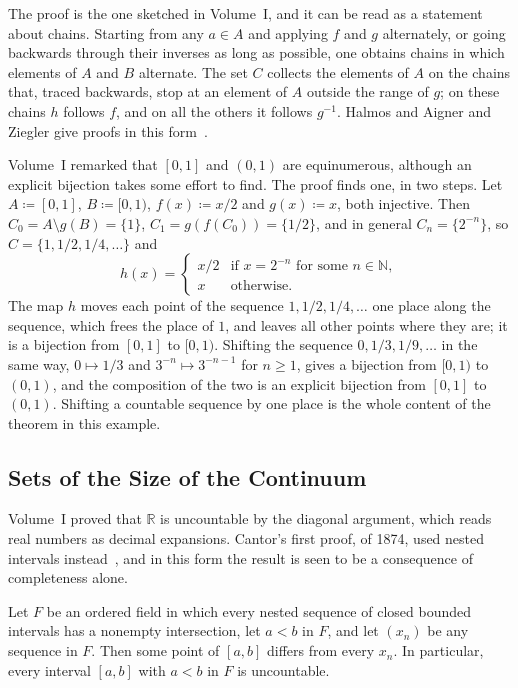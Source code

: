 The proof is the one sketched in Volume~I, and it can be read as a statement about chains. Starting from any $a\in A$ and applying $f$ and $g$ alternately, or going backwards through their inverses as long as possible, one obtains chains in which elements of $A$ and $B$ alternate. The set $C$ collects the elements of $A$ on the chains that, traced backwards, stop at an element of $A$ outside the range of $g$; on these chains $h$ follows $f$, and on all the others it follows $g^{-1}$. Halmos and Aigner and Ziegler give proofs in this form~\cite{halmos1960naive,aigner2018proofs}.

Volume~I remarked that $[0,1]$ and $(0,1)$ are equinumerous, although an explicit bijection takes some effort to find. The proof finds one, in two steps. Let $A\coloneqq[0,1]$, $B\coloneqq[0,1)$, $f(x)\coloneqq x/2$ and $g(x)\coloneqq x$, both injective. Then $C_0=A\setminus g(B)=\{1\}$, $C_1=g(f(C_0))=\{1/2\}$, and in general $C_n=\{2^{-n}\}$, so $C=\{1,1/2,1/4,\ldots\}$ and
\[
h(x)=\begin{cases}x/2&\text{if }x=2^{-n}\text{ for some }n\in\mathbb N,\\ x&\text{otherwise}.\end{cases}
\]
The map $h$ moves each point of the sequence $1,1/2,1/4,\ldots$ one place along the sequence, which frees the place of $1$, and leaves all other points where they are; it is a bijection from $[0,1]$ to $[0,1)$. Shifting the sequence $0,1/3,1/9,\ldots$ in the same way, $0\mapsto1/3$ and $3^{-n}\mapsto3^{-n-1}$ for $n\ge1$, gives a bijection from $[0,1)$ to $(0,1)$, and the composition of the two is an explicit bijection from $[0,1]$ to $(0,1)$. Shifting a countable sequence by one place is the whole content of the theorem in this example.

\subsection{Sets of the Size of the Continuum}

Volume~I proved that $\mathbb R$ is uncountable by the diagonal argument, which reads real numbers as decimal expansions. Cantor's first proof, of 1874, used nested intervals instead~\cite{cantor1874}, and in this form the result is seen to be a consequence of completeness alone.

\begin{proposition}
\label{prop:cantor-nested}
Let $F$ be an ordered field in which every nested sequence of closed bounded intervals has a nonempty intersection, let $a<b$ in $F$, and let $(x_n)$ be any sequence in $F$. Then some point of $[a,b]$ differs from every $x_n$. In particular, every interval $[a,b]$ with $a<b$ in $F$ is uncountable.
\end{proposition}


